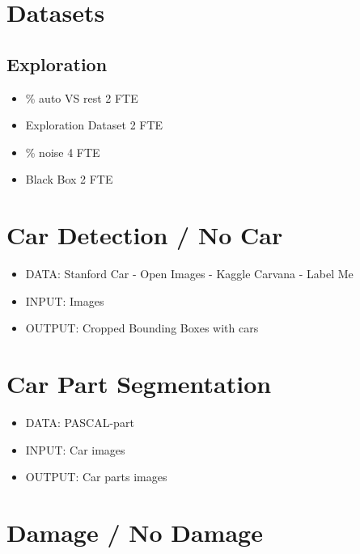 


\section{Datasets}

\subsection{Exploration}

\begin{itemize}
    \item \% auto VS rest 2 FTE
    \item Exploration Dataset 2 FTE
    \item \% noise 4 FTE
    \item Black Box 2 FTE
\end{itemize}

\section{Car Detection / No Car}

\begin{itemize}
    \item DATA: Stanford Car - Open Images - Kaggle Carvana - Label Me
    \item INPUT: Images
    \item OUTPUT: Cropped Bounding Boxes with cars
\end{itemize}

\section{Car Part Segmentation}
\begin{itemize}
    \item DATA: PASCAL-part
    \item INPUT: Car images
    \item OUTPUT: Car parts images
\end{itemize}

\section{Damage / No Damage}

